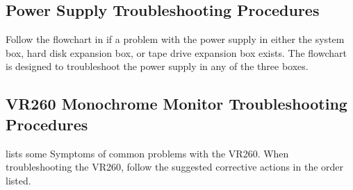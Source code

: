 \subsection{Power Supply Troubleshooting Procedures}

Follow the flowchart in  if a problem with the power supply in
either the system box, hard disk expansion box, or tape drive expansion
box exists. The flowchart is designed to troubleshoot the power supply in
any of the three boxes.



\newpage

\subsection{VR260 Monochrome Monitor Troubleshooting Procedures}

 lists some Symptoms of common problems with the VR260.
When troubleshooting the VR260, follow the suggested corrective actions
in the order listed.

